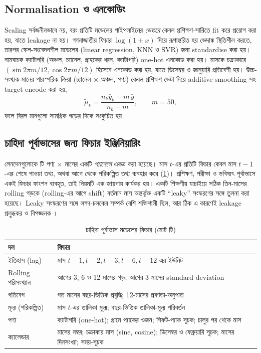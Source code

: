 \subsection{Normalisation ও এনকোডিং}
Scaling সর্বজনীনভাবে নয়, বরং প্রতিটি মডেলের পাইপলাইনের \emph{ভেতরে} কেবল প্রশিক্ষণ-সারিতে fit করে প্রয়োগ করা হয়, যাতে leakage না
হয়। গণনাজাতীয় ফিচার $\log(1+x)$ দিয়ে রূপান্তরিত হয় ভেদাঙ্ক স্থিতিশীল করতে, তারপর স্কেল-সংবেদনশীল মডেলের (linear regression,
KNN ও SVR) জন্য standardise করা হয়। নামবাচক ক্যাটাগরি (অঞ্চল, চ্যানেল, গ্রাহকের ধরন, ক্যাটাগরি) one-hot এনকোড করা হয়। মাসকে
চক্রাকারে $(\sin 2\pi m/12, \cos 2\pi m/12)$ হিসেবে এনকোড করা হয়, যাতে ডিসেম্বর ও জানুয়ারি প্রতিবেশী হয়। উচ্চ-সংখ্যক মানের
পারস্পরিক ক্রিয়া (চ্যানেল $\times$ অঞ্চল, পণ্য) কেবল প্রশিক্ষণ ডেটা দিয়ে additive smoothing-সহ target-encode করা হয়,
\[
  \tilde\mu_k = \frac{n_k \bar y_k + m\,\bar y}{n_k + m}, \qquad m=50,
\]
ফলে বিরল মানগুলো সামগ্রিক গড়ের দিকে সংকুচিত হয়।

\subsection{চাহিদা পূর্বাভাসের জন্য ফিচার ইঞ্জিনিয়ারিং}
লেনদেনগুলোকে \PanelSeries টি পণ্য $\times$ মাসের একটি \emph{প্যানেলে} একত্র করা হয়েছে। মাস $t$-এর প্রতিটি ফিচার কেবল মাস $t-1$-এর
শেষে পাওয়া তথ্য, অথবা আগে থেকে পরিকল্পিত তথ্য ব্যবহার করে (\cref{tab:features})। প্রশিক্ষণ, পরীক্ষা ও ভবিষ্যৎ পূর্বাভাসে একই ফিচার
ফাংশন ব্যবহৃত, তাই নিয়মটি এক জায়গায় কার্যকর হয়। একটি শিক্ষণীয় যাচাইয়ে সঠিক তিন-মাসের rolling গড়কে (rolling-এর আগে shift)
বর্তমান মাস অন্তর্ভুক্ত একটি ``leaky'' সংস্করণের সঙ্গে তুলনা করা হয়েছে। Leaky সংস্করণের সঙ্গে লক্ষ্য-চলকের সম্পর্ক বেশি শক্তিশালী ছিল,
আর ঠিক এ কারণেই leakage প্রলুব্ধকর ও বিপজ্জনক \citep{kaufman2012}।

\begin{table}[htbp]\centering\small
\caption{চাহিদা পূর্বাভাস মডেলের ফিচার (মোট \PanelFeatures টি)}\label{tab:features}
\begin{tabularx}{\linewidth}{@{}lX@{}}
\toprule
\textbf{দল} & \textbf{ফিচার} \\ \midrule
ইতিহাস (lag) & মাস $t-1, t-2, t-3, t-6, t-12$-এর ইউনিট \\
Rolling পরিসংখ্যান & আগের 3, 6 ও 12 মাসের গড়; আগের 3 মাসের standard deviation \\
গতিবেগ & গত মাসের বছর-ভিত্তিক প্রবৃদ্ধি; 12-মাসের প্রবণতা-অনুপাত \\
মূল্য (পরিকল্পিত) & মাস $t$-এর তালিকা মূল্য; বছর-ভিত্তিক তালিকা-মূল্য পরিবর্তন \\
পণ্য & ক্যাটাগরি (one-hot); গ্রামে প্যাকের ওজন; গিফট-প্যাক সূচক; চালুর পর থেকে মাস \\
ক্যালেন্ডার & মাসের নম্বর; চক্রাকার মাস (sine, cosine); ডিসেম্বর ও ফেব্রুয়ারি সূচক; মাসের দিনসংখ্যা; সময়-সূচক \\ \bottomrule
\end{tabularx}
\end{table}

